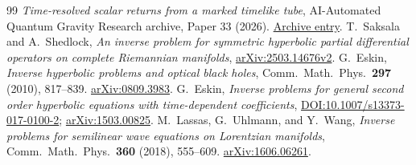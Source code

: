 \documentclass[11pt]{article}
\numberwithin{equation}{section}
\begin{document}
\begin{thebibliography}{99}
 \emph{Time-resolved scalar returns from a marked timelike tube}, AI-Automated Quantum Gravity Research archive, Paper 33 (2026). \href{https://github.com/g3173028019-beep/ai-automated-quantum-gravity-research/tree/main/papers/33-vacuum-wave-returns}{Archive entry}.
 T.\ Saksala and A.\ Shedlock, \emph{An inverse problem for symmetric hyperbolic partial differential operators on complete Riemannian manifolds}, \href{https://arxiv.org/abs/2503.14676v2}{arXiv:2503.14676v2}.
 G.\ Eskin, \emph{Inverse hyperbolic problems and optical black holes}, Comm.\ Math.\ Phys.\ \textbf{297} (2010), 817--839. \href{https://arxiv.org/abs/0809.3983}{arXiv:0809.3983}.
 G.\ Eskin, \emph{Inverse problems for general second order hyperbolic equations with time-dependent coefficients}, \href{https://doi.org/10.1007/s13373-017-0100-2}{DOI:10.1007/s13373-017-0100-2}; \href{https://arxiv.org/abs/1503.00825}{arXiv:1503.00825}.
 M.\ Lassas, G.\ Uhlmann, and Y.\ Wang, \emph{Inverse problems for semilinear wave equations on Lorentzian manifolds}, Comm.\ Math.\ Phys.\ \textbf{360} (2018), 555--609. \href{https://arxiv.org/abs/1606.06261}{arXiv:1606.06261}.
\end{thebibliography}
\end{document}
